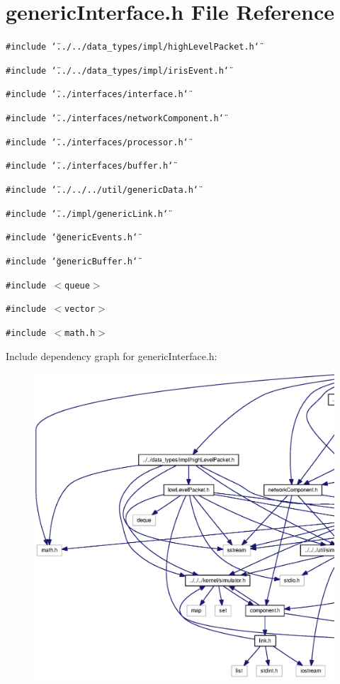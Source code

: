 \section{genericInterface.h File Reference}
\label{genericInterface_8h}
{\tt \#include \char`\"{}../../data\_\-types/impl/highLevelPacket.h\char`\"{}}\par
{\tt \#include \char`\"{}../../data\_\-types/impl/irisEvent.h\char`\"{}}\par
{\tt \#include \char`\"{}../interfaces/interface.h\char`\"{}}\par
{\tt \#include \char`\"{}../interfaces/networkComponent.h\char`\"{}}\par
{\tt \#include \char`\"{}../interfaces/processor.h\char`\"{}}\par
{\tt \#include \char`\"{}../interfaces/buffer.h\char`\"{}}\par
{\tt \#include \char`\"{}../../../util/genericData.h\char`\"{}}\par
{\tt \#include \char`\"{}../impl/genericLink.h\char`\"{}}\par
{\tt \#include \char`\"{}genericEvents.h\char`\"{}}\par
{\tt \#include \char`\"{}genericBuffer.h\char`\"{}}\par
{\tt \#include $<$queue$>$}\par
{\tt \#include $<$vector$>$}\par
{\tt \#include $<$math.h$>$}\par


Include dependency graph for genericInterface.h:\nopagebreak
\begin{figure}[H]
\begin{center}
\leavevmode
\includegraphics[width=420pt]{genericInterface_8h__incl}
\end{center}
\end{figure}


